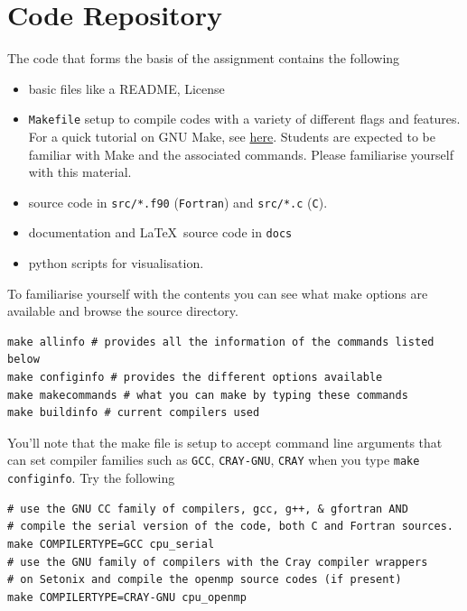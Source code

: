 \section{Code Repository}\label{sec:code}
The code that forms the basis of the assignment contains the following 
\begin{itemize}
	\item basic files like a README, License
	\item \texttt{Makefile} setup to compile codes with a variety of different flags and features. For a quick tutorial on GNU Make, see \href{https://www.gnu.org/software/make/}{here}. Students are expected to be familiar with Make and the associated commands. Please familiarise yourself with this material. 
	\item source code in \texttt{src/*.f90} (\texttt{Fortran}) and \texttt{src/*.c} (\texttt{C}). 
	\item documentation and \LaTeX\ source code in \texttt{docs}
	\item python scripts for visualisation. 
\end{itemize}
To familiarise yourself with the contents you can see what make options are available and browse the source directory. 
\begin{center}
\begin{minipage}{0.95\textwidth}
\small
\begin{verbatim}
make allinfo # provides all the information of the commands listed below  
make configinfo # provides the different options available 
make makecommands # what you can make by typing these commands
make buildinfo # current compilers used
\end{verbatim}
\end{minipage}
\end{center}
You'll note that the make file is setup to accept command line arguments that can set compiler families such as \texttt{GCC}, \texttt{CRAY-GNU}, \texttt{CRAY} when you type \texttt{make configinfo}. Try the following
\begin{center}
\begin{minipage}{0.95\textwidth}
\small
\begin{verbatim}
# use the GNU CC family of compilers, gcc, g++, & gfortran AND 
# compile the serial version of the code, both C and Fortran sources.
make COMPILERTYPE=GCC cpu_serial 
# use the GNU family of compilers with the Cray compiler wrappers 
# on Setonix and compile the openmp source codes (if present)
make COMPILERTYPE=CRAY-GNU cpu_openmp 
\end{verbatim}
\end{minipage}
\end{center}


